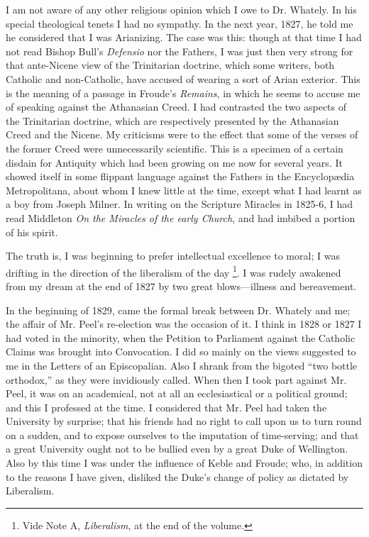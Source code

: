 I am not aware of any other religious opinion which I owe to Dr.
Whately. In his special theological tenets I had no sympathy. In the
next year, 1827, he told me he considered that I was Arianizing. The
case was this: though at that time I had not read Bishop Bull's \emph{Defensio}
nor the Fathers, I was just then very strong for that ante-Nicene view
of the Trinitarian doctrine, which some writers, both Catholic and
non-Catholic, have accused of wearing a sort of Arian exterior. This
is the meaning of a passage in Froude's \emph{Remains}, in which he seems to
accuse me of speaking against the Athanasian Creed. I had contrasted
the two aspects of the Trinitarian doctrine, which are respectively
presented by the Athanasian Creed and the Nicene. My criticisms were
to the effect that some of the verses of the former Creed were
unnecessarily scientific. This is a specimen of a certain disdain for
Antiquity which had
been growing on me now for several years. It showed itself in some
flippant language against the Fathers in the Encyclopædia
Metropolitana, about whom I knew little at the time, except what I had
learnt as a boy from Joseph Milner. In writing on the Scripture
Miracles in 1825-6, I had read Middleton \emph{On the Miracles of the early
Church}, and had imbibed a portion of his spirit.

The truth is, I was beginning to prefer intellectual excellence to
moral; I was drifting in the direction of the liberalism of the day \footnote{Vide Note
A, \emph{Liberalism}, at the end of the volume.}.
I was rudely awakened from my dream at the end of 1827 by two
great blows—illness and bereavement.

In the beginning of 1829, came the formal break between Dr. Whately
and me; the affair of Mr. Peel's re-election was
the occasion of it. I think in 1828 or 1827 I had voted in the
minority, when the Petition to Parliament against the Catholic Claims
was brought into Convocation. I did so mainly on the views suggested
to me in the Letters of an Episcopalian. Also I shrank from the bigoted ``two bottle orthodox,'' as they were invidiously
called. When then I took part against Mr. Peel, it was on an
academical, not at all an ecclesiastical or a political ground; and
this I professed at the time. I considered that Mr. Peel had taken the
University by surprise; that his friends had no right to call upon us to turn round on a sudden, and to
expose ourselves to the imputation of time-serving; and that a great
University ought not to be bullied even by a great Duke of Wellington.
Also by this time I was under the influence of Keble and Froude; who,
in addition to the reasons I have given, disliked the Duke's change of
policy as dictated by Liberalism.

